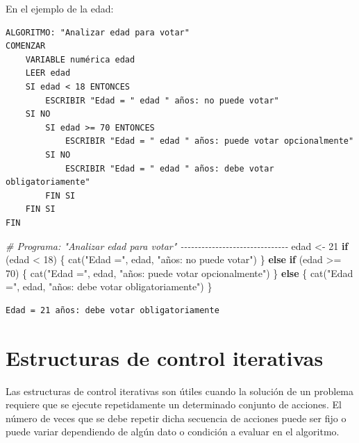 \documentclass[
]{book}
\newenvironment{Shaded}{\begin{snugshade}}{\end{snugshade}}
\newcommand{\CommentTok}[1]{\textcolor[rgb]{0.56,0.35,0.01}{\textit{#1}}}
\newcommand{\ControlFlowTok}[1]{\textcolor[rgb]{0.13,0.29,0.53}{\textbf{#1}}}
\newcommand{\DecValTok}[1]{\textcolor[rgb]{0.00,0.00,0.81}{#1}}
\newcommand{\FunctionTok}[1]{\textcolor[rgb]{0.00,0.00,0.00}{#1}}
\newcommand{\NormalTok}[1]{#1}
\newcommand{\OtherTok}[1]{\textcolor[rgb]{0.56,0.35,0.01}{#1}}
\newcommand{\SpecialCharTok}[1]{\textcolor[rgb]{0.00,0.00,0.00}{#1}}
\newcommand{\StringTok}[1]{\textcolor[rgb]{0.31,0.60,0.02}{#1}}
\begin{document}
En el ejemplo de la edad:

\begin{verbatim}
ALGORITMO: "Analizar edad para votar"
COMENZAR
    VARIABLE numérica edad
    LEER edad
    SI edad < 18 ENTONCES
        ESCRIBIR "Edad = " edad " años: no puede votar"
    SI NO
        SI edad >= 70 ENTONCES
            ESCRIBIR "Edad = " edad " años: puede votar opcionalmente"
        SI NO
            ESCRIBIR "Edad = " edad " años: debe votar obligatoriamente"
        FIN SI
    FIN SI
FIN
\end{verbatim}

\begin{Shaded}
\begin{Highlighting}[]
\CommentTok{\# Programa: "Analizar edad para votar" {-}{-}{-}{-}{-}{-}{-}{-}{-}{-}{-}{-}{-}{-}{-}{-}{-}{-}{-}{-}{-}{-}{-}{-}{-}{-}{-}{-}{-}{-}{-}}
\NormalTok{edad }\OtherTok{\textless{}{-}} \DecValTok{21}
\ControlFlowTok{if}\NormalTok{ (edad }\SpecialCharTok{\textless{}} \DecValTok{18}\NormalTok{) \{}
    \FunctionTok{cat}\NormalTok{(}\StringTok{"Edad ="}\NormalTok{, edad, }\StringTok{"años: no puede votar"}\NormalTok{)}
\NormalTok{\} }\ControlFlowTok{else} \ControlFlowTok{if}\NormalTok{ (edad }\SpecialCharTok{\textgreater{}=} \DecValTok{70}\NormalTok{) \{}
    \FunctionTok{cat}\NormalTok{(}\StringTok{"Edad ="}\NormalTok{, edad, }\StringTok{"años: puede votar opcionalmente"}\NormalTok{)}
\NormalTok{\} }\ControlFlowTok{else}\NormalTok{ \{}
    \FunctionTok{cat}\NormalTok{(}\StringTok{"Edad ="}\NormalTok{, edad, }\StringTok{"años: debe votar obligatoriamente"}\NormalTok{)}
\NormalTok{\}}
\end{Highlighting}
\end{Shaded}

\begin{verbatim}
Edad = 21 años: debe votar obligatoriamente
\end{verbatim}

\hypertarget{estructuras-de-control-iterativas}{%
\section{Estructuras de control iterativas}\label{estructuras-de-control-iterativas}}

Las estructuras de control iterativas son útiles cuando la solución de un problema requiere que se ejecute repetidamente un determinado conjunto de acciones. El número de veces que se debe repetir dicha secuencia de acciones puede ser fijo o puede variar dependiendo de algún dato o condición a evaluar en el algoritmo.
\end{document}

